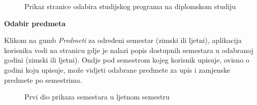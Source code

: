 \documentclass[times, utf8, zavrsni, numeric]{fer}
\begin{document}
        \begin{figure} [H]
          \centering
          \caption{Prikaz stranice odabira studijskog programa na diplomskom studiju}
        \end{figure}
        
        
        \noindent\textbf{Odabir predmeta}
        
        Klikom na gumb \textit{Predmeti} za određeni semestar (zimski ili ljetni), aplikacija korisnika vodi na stranicu gdje je nalazi popis dostupnih semestara u odabranoj godini (zimski ili ljetni). Ondje pod semestrom kojeg korisnik upisuje, ovisno o godini koju upisuje, može vidjeti odabrane predmete za upis i zamjenske predmete po semestrima.
        
        \begin{figure} [H]
          \centering
          \caption{Prvi dio prikaza semestara u ljetnom semestru}
          \label{fig:courses_stara1}
        \end{figure}
        
\end{document}

